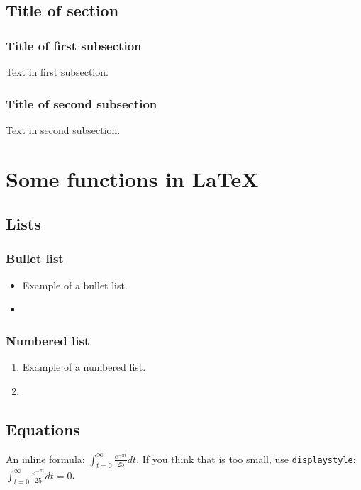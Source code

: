 \documentclass[11pt, a4paper, twoside]{report}
\begin{document}
\section{Title of section}
\label{section: name of section} %
  \subsection{Title of first subsection}
    Text in first subsection.
  \subsection{Title of second subsection}
    Text in second subsection.


\chapter{Some functions in \LaTeX} 

\section{Lists}
  \subsection{Bullet list}  
    \begin{itemize} 
      \item Example of a bullet list.
      \item
    \end{itemize}

    \subsection{Numbered list}  
    \begin{enumerate}
      \item Example of a numbered list.
      \item
    \end{enumerate}

\section{Equations}
An inline formula: $\int_{t=0}^{\infty} \frac{e^{-\pi t}}{25} dt$. If you think that is too small, use {\tt displaystyle}: $\displaystyle{\int_{t=0}^{\infty} \frac{e^{-\pi t}}{25} dt=0}$. 
\end{document}
